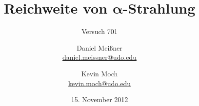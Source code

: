 

\newcommand{\name}[1]{\textsc{#1}}

\titlehead{{TU Dortmund \hfill WS~12/13\\}
Fakultät Physik\\
Experimentelle Übungen I}

\subject{Versuchsprotokoll}
\title{Reichweite von $\boldsymbol{\alpha}$-Strahlung}
\subtitle{Versuch 701}

\author{Daniel Meißner\\
{\normalsize\url{daniel.meissner@udo.edu}}
\and
Kevin Moch\\
{\normalsize\url{kevin.moch@udo.edu}}}

\date{15. November 2012}


\maketitle

\tableofcontents
\clearpage







\printbibliography
\nocite{v701}



